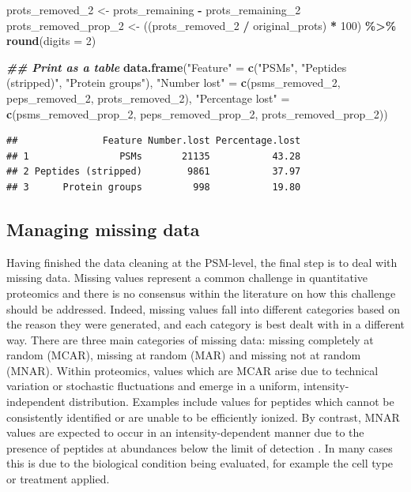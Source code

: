 \documentclass[9pt,a4paper,]{extarticle}
\newenvironment{Shaded}{\begin{snugshade}}{\end{snugshade}}
\newcommand{\AttributeTok}[1]{\textcolor[rgb]{0.13,0.29,0.53}{#1}}
\newcommand{\DecValTok}[1]{\textcolor[rgb]{0.00,0.00,0.81}{#1}}
\newcommand{\DocumentationTok}[1]{\textcolor[rgb]{0.56,0.35,0.01}{\textbf{\textit{#1}}}}
\newcommand{\FunctionTok}[1]{\textcolor[rgb]{0.13,0.29,0.53}{\textbf{#1}}}
\newcommand{\NormalTok}[1]{#1}
\newcommand{\OtherTok}[1]{\textcolor[rgb]{0.56,0.35,0.01}{#1}}
\newcommand{\SpecialCharTok}[1]{\textcolor[rgb]{0.81,0.36,0.00}{\textbf{#1}}}
\newcommand{\StringTok}[1]{\textcolor[rgb]{0.31,0.60,0.02}{#1}}
\begin{document}
\begin{Shaded}
\begin{Highlighting}[]
\NormalTok{prots\_removed\_2 }\OtherTok{\textless{}{-}}\NormalTok{ prots\_remaining }\SpecialCharTok{{-}}\NormalTok{ prots\_remaining\_2}
\NormalTok{prots\_removed\_prop\_2 }\OtherTok{\textless{}{-}}\NormalTok{ ((prots\_removed\_2 }\SpecialCharTok{/}\NormalTok{ original\_prots) }\SpecialCharTok{*} \DecValTok{100}\NormalTok{) }\SpecialCharTok{\%\textgreater{}\%}
  \FunctionTok{round}\NormalTok{(}\AttributeTok{digits =} \DecValTok{2}\NormalTok{)}


\DocumentationTok{\#\# Print as a table}
\FunctionTok{data.frame}\NormalTok{(}\StringTok{"Feature"} \OtherTok{=} \FunctionTok{c}\NormalTok{(}\StringTok{"PSMs"}\NormalTok{,}
                         \StringTok{"Peptides (stripped)"}\NormalTok{,}
                         \StringTok{"Protein groups"}\NormalTok{),}
           \StringTok{"Number lost"} \OtherTok{=} \FunctionTok{c}\NormalTok{(psms\_removed\_2,}
\NormalTok{                             peps\_removed\_2,}
\NormalTok{                             prots\_removed\_2),}
           \StringTok{"Percentage lost"} \OtherTok{=} \FunctionTok{c}\NormalTok{(psms\_removed\_prop\_2,}
\NormalTok{                                 peps\_removed\_prop\_2,}
\NormalTok{                                 prots\_removed\_prop\_2))}
\end{Highlighting}
\end{Shaded}

\begin{verbatim}
##               Feature Number.lost Percentage.lost
## 1                PSMs       21135           43.28
## 2 Peptides (stripped)        9861           37.97
## 3      Protein groups         998           19.80
\end{verbatim}

\subsection{Managing missing data}\label{managing-missing-data}

Having finished the data cleaning at the PSM-level, the final step is to deal
with missing data. Missing values represent a common challenge in quantitative
proteomics and there is no consensus within the literature on how this challenge
should be addressed. Indeed, missing values fall into different categories based
on the reason they were generated, and each category is best dealt with in a
different way. There are three main categories of missing data: missing
completely at random (MCAR), missing at random (MAR) and missing not at random
(MNAR). Within proteomics, values which are MCAR arise due to technical
variation or stochastic fluctuations and emerge in a uniform,
intensity-independent distribution. Examples include values for peptides which
cannot be consistently identified or are unable to be efficiently ionized. By
contrast, MNAR values are expected to occur in an intensity-dependent manner due
to the presence of peptides at abundances below the limit of detection
\citep{Karpievitch2009, Lazar2016, QFeat}. In many cases this is due to the biological
condition being evaluated, for example the cell type or treatment applied.
\end{document}
